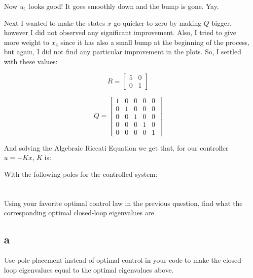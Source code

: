 \documentclass[10pt,a4paper]{article}
\begin{document}
Now $u_{1}$ looks good! It goes smoothly down and the bump is gone. Yay.
\medskip

Next I wanted to make the states $x$ go quicker to zero by making $Q$ bigger, however I did not observed any significant improvement. Also, I tried to give more weight to $x_{4}$ since it has also a small bump at the beginning of the process, but again, I did not find any particular improvement in the plots. So, I settled with these values:

\[
R = \begin{bmatrix}
5 & 0 \\
0 & 1
\end{bmatrix} 
\]

\[
Q = \begin{bmatrix}
1 & 0 & 0 & 0 & 0 \\
0 & 1 & 0 & 0 & 0 \\
0 & 0 & 1 & 0 & 0 \\
0 & 0 & 0 & 1 & 0 \\
0 & 0 & 0 & 0 & 1 
\end{bmatrix} 
\]

And solving the Algebraic Riccati Equation we get that, for our controller $u = -Kx$, $K$ is:

\begin{center}
\end{center}

With the following poles for the controlled system:

\begin{center} 
 \end{center}

\section{}
Using your favorite optimal control law in the previous question, find what the corresponding optimal  closed-loop eigenvalues are. 

\subsection*{a}
Use pole placement instead of optimal control in your code to make the closed-loop eigenvalues equal to the optimal eigenvalues above.
\end{document}
